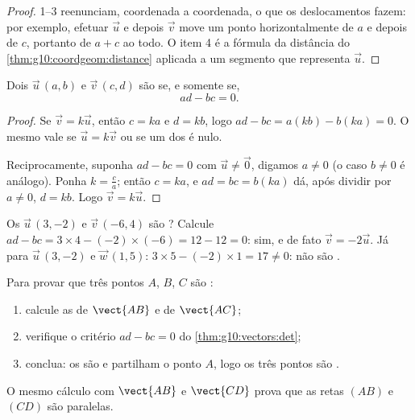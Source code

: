\begin{proof}
1--3 reenunciam, coordenada a coordenada, o que os deslocamentos fazem:
por exemplo, efetuar $\vec u$ e depois $\vec v$ move um ponto
horizontalmente de $a$ e depois de $c$, portanto de $a + c$ ao todo. O
item 4 é a fórmula da distância do \cref{thm:g10:coordgeom:distance}
aplicada a um segmento que representa $\vec u$.
\end{proof}

\begin{theorem}\label{thm:g10:vectors:det}
Dois  $\vec u\,(a, b)$ e $\vec v\,(c, d)$ são  se, e
somente se,
\[
ad - bc = 0 .
\]
\end{theorem}

\begin{proof}
Se $\vec v = k\vec u$, então $c = ka$ e $d = kb$, logo
$ad - bc = a(kb) - b(ka) = 0$. O mesmo vale se $\vec u = k \vec v$ ou se
um dos  é nulo.

Reciprocamente, suponha $ad - bc = 0$ com $\vec u \neq \vec 0$, digamos
$a \neq 0$ (o caso $b \neq 0$ é análogo). Ponha $k = \frac{c}{a}$; então
$c = ka$, e $ad = bc = b(ka)$ dá, após dividir por $a \neq 0$, $d = kb$.
Logo $\vec v = k\vec u$.
\end{proof}

\begin{example}\label{ex:g10:vectors:det}
Os  $\vec u\,(3, -2)$ e $\vec v\,(-6, 4)$ são ? Calcule
$ad - bc = 3 \times 4 - (-2)\times(-6) = 12 - 12 = 0$: sim, e de fato
$\vec v = -2\vec u$. Já para $\vec u\,(3, -2)$ e $\vec w\,(1, 5)$:
$3 \times 5 - (-2) \times 1 = 17 \neq 0$: não são .
\end{example}

\begin{method}\label{met:g10:vectors:alignment}
Para provar que três pontos $A$, $B$, $C$ são :
\begin{enumerate}
  \item calcule as  de $\vect{AB}$ e de $\vect{AC}$;
  \item verifique o critério $ad - bc = 0$ do
        \cref{thm:g10:vectors:det};
  \item conclua: os  são  e partilham o ponto $A$, logo
        os três pontos são .
\end{enumerate}
O mesmo cálculo com $\vect{AB}$ e $\vect{CD}$ prova que as retas $(AB)$ e
$(CD)$ são paralelas.
\end{method}

